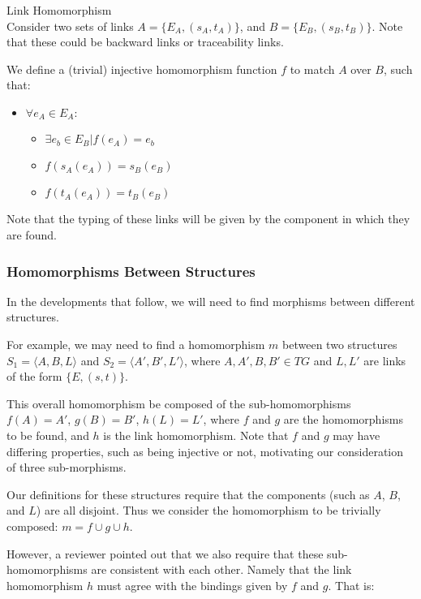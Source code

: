 \begin{definition}{Link Homomorphism\\}
\label{def:link_homomorphism}
Consider two sets of links $A = \{E_{A}, (s_{A}, t_{A})\}$, and $B = \{E_{B}, (s_{B}, t_{B})\}$. Note that these could be backward links or traceability links.

We define a (trivial) injective homomorphism function $f$ to match $A$ over $B$, such that:

\begin{itemize}
\item $\forall e_A \in E_A:$
\begin{itemize}
\item $\exists e_b \in E_{B} | f(e_A) = e_b$
\item $f(s_{A}(e_A)) = s_{B}(e_B)$
\item $f(t_{A}(e_A)) = t_{B}(e_B)$
\end{itemize}
\end{itemize} 
\end{definition}

Note that the typing of these links will be given by the component in which they are found.

\subsubsection{Homomorphisms Between Structures}
\label{subsubsec:structure_homomorphism}

In the developments that follow, we will need to find morphisms between different structures.

For example, we may need to find a homomorphism $m$ between two structures $S_1 = \langle A, B, L\rangle$ and  $S_2 = \langle A', B', L'\rangle$, where $A, A', B, B' \in TG$ and $L, L'$ are links of the form $\{E, (s, t)\}$.

This overall homomorphism be composed of the sub-homomorphisms $f(A) = A'$, $g(B) = B'$, $h(L) = L'$, where $f$ and $g$ are the homomorphisms to be found, and $h$ is the link homomorphism. Note that $f$ and $g$ may have differing properties, such as being injective or not, motivating our consideration of three sub-morphisms.

Our definitions for these structures require that the components (such as $A$, $B$, and $L$) are all disjoint. Thus we consider the homomorphism to be trivially composed: $m = f \cup g \cup h$. 

However, a reviewer pointed out that we also require that these sub-homomorphisms are consistent with each other. Namely that the link homomorphism $h$ must agree with the bindings given by $f$ and $g$. That is:




